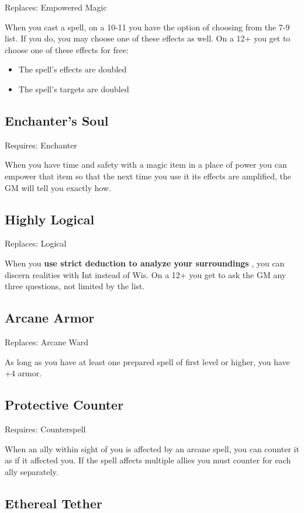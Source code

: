 Replaces: Empowered Magic

When you cast a spell, on a 10-11 you have the option of choosing from the 7-9 list. If you do, you may choose one of these effects as well. On a 12+ you get to choose one of these effects for free:
\begin{itemize}
\item The spell's effects are doubled
\item The spell's targets are doubled

\end{itemize}
\subsection{Enchanter's Soul}

Requires: Enchanter

When you have time and safety with a magic item in a place of power you can empower that item so that the next time you use it its effects are amplified, the GM will tell you exactly how.
\subsection{Highly Logical}

Replaces: Logical

When you \textbf{use strict deduction to analyze your surroundings}
, you can discern realities with Int instead of Wis. On a 12+ you get to ask the GM any three questions, not limited by the list.
\subsection{Arcane Armor}

Replaces: Arcane Ward

As long as you have at least one prepared spell of first level or higher, you have +4 armor.
\subsection{Protective Counter}

Requires: Counterspell

When an ally within sight of you is affected by an arcane spell, you can counter it as if it affected you. If the spell affects multiple allies you must counter for each ally separately.
\subsection{Ethereal Tether}

